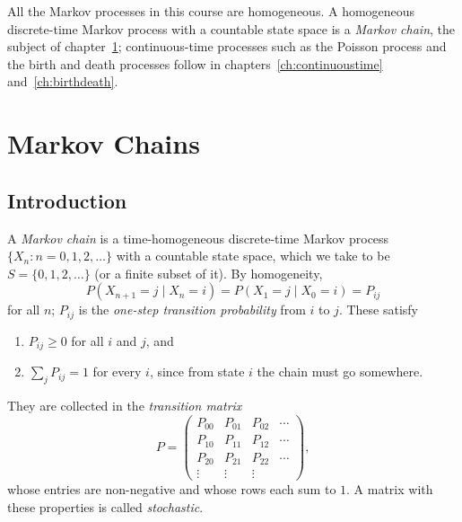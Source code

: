 \documentclass[12pt,a4paper]{report}
\theoremstyle{definition}
\begin{document}
All the Markov processes in this course are homogeneous. A homogeneous discrete-time Markov
process with a countable state space is a \emph{Markov chain}, the subject of
chapter~\ref{ch:markovchains}; continuous-time processes such as the Poisson process and the
birth and death processes follow in chapters~\ref{ch:continuoustime} and~\ref{ch:birthdeath}.

\chapter{Markov Chains}
\label{ch:markovchains}

\section{Introduction}

A \emph{Markov chain} is a time-homogeneous discrete-time Markov process
$\{X_n : n = 0, 1, 2, \dots\}$ with a countable state space, which we take to be
$S = \{0, 1, 2, \dots\}$ (or a finite subset of it). By homogeneity,
\[P(X_{n + 1} = j\mid X_n = i) = P(X_1 = j\mid X_0 = i) = P_{ij}\]
for all $n$; $P_{ij}$ is the \emph{one-step transition probability} from $i$ to $j$. These
satisfy
\begin{enumerate}
\item[(i)] $P_{ij}\geq 0$ for all $i$ and $j$, and
\item[(ii)] $\sum_jP_{ij} = 1$ for every $i$, since from state $i$ the chain must go somewhere.
\end{enumerate}
They are collected in the \emph{transition matrix}
\[P = \begin{pmatrix}
P_{00} & P_{01} & P_{02} & \cdots\\
P_{10} & P_{11} & P_{12} & \cdots\\
P_{20} & P_{21} & P_{22} & \cdots\\
\vdots & \vdots & \vdots &
\end{pmatrix},\]
whose entries are non-negative and whose rows each sum to $1$. A matrix with these
properties is called \emph{stochastic}.
\end{document}

